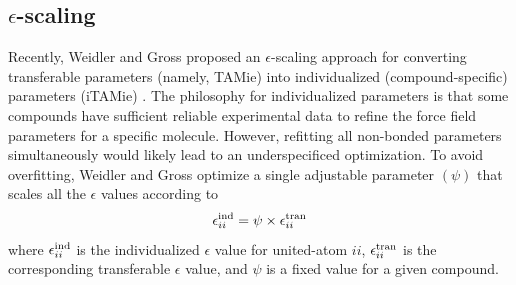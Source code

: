 \documentclass[journal=jced,manuscript=article]{achemso}
\begin{document}


\subsection{$\epsilon$-scaling}

Recently, Weidler and Gross proposed an $\epsilon$-scaling approach for converting transferable parameters (namely, TAMie) into individualized (compound-specific) parameters (iTAMie) \cite{Weidler2018}. The philosophy for individualized parameters is that some compounds have sufficient reliable experimental data to refine the force field parameters for a specific molecule. However, refitting all non-bonded parameters simultaneously would likely lead to an underspecificed optimization. To avoid overfitting, Weidler and Gross optimize a single adjustable parameter $(\psi)$ that scales all the $\epsilon$ values according to
\begin{equation}
\epsilon_{ii}^{\rm ind} = \psi \times \epsilon_{ii}^{\rm tran}
\end{equation}
where $\epsilon_{ii}^{\rm ind}$ is the individualized $\epsilon$ value for united-atom $ii$, $\epsilon_{ii}^{\rm tran}$ is the corresponding transferable $\epsilon$ value, and $\psi$ is a fixed value for a given compound. 



\end{document}

